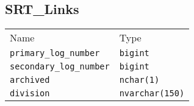 \subsection{SRT\_Links}
\begin{table}[h!]
\centering
\begin{tabular}{ll}
Name    & Type  \\
\verb|primary_log_number|   &   \verb|bigint|   \\
\verb|secondary_log_number| &   \verb|bigint|   \\
\verb|archived|             &   \verb|nchar(1)| \\
\verb|division|             &   \verb|nvarchar(150)|
\end{tabular}
\end{table}
